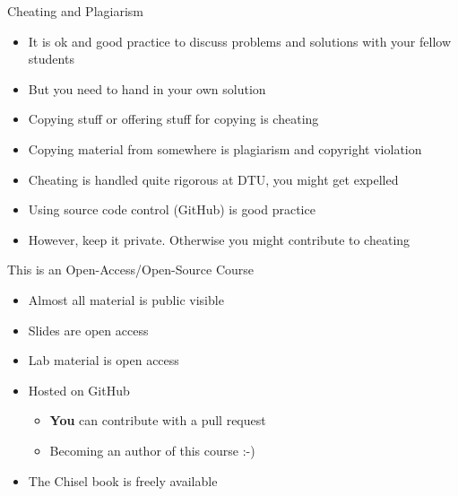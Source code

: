 
\begin{frame}[fragile]{Cheating and Plagiarism}
\begin{itemize}
\item It is ok and good practice to discuss problems and solutions with your fellow students
\item But you need to hand in your own solution
\item Copying stuff or offering stuff for copying is cheating
\item Copying material from somewhere is plagiarism and copyright violation
\item Cheating is handled quite rigorous at DTU, you might get expelled
\item Using source code control (GitHub) is good practice
\item However, keep it private. Otherwise you might contribute to cheating
\end{itemize}
\end{frame}


\begin{frame}[fragile]{This is an Open-Access/Open-Source Course}
\begin{itemize}
\item Almost all material is public visible
\item Slides are open access
\item Lab material is open access
\item Hosted on GitHub
\begin{itemize}
\item \textbf{You} can contribute with a pull request
\item Becoming an author of this course :-)
\end{itemize}
\item The Chisel book is freely available
\end{itemize}
\end{frame}

